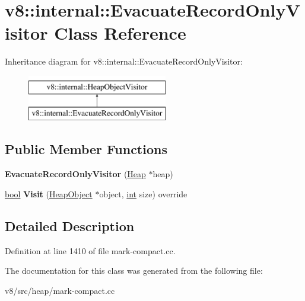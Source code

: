 \hypertarget{classv8_1_1internal_1_1EvacuateRecordOnlyVisitor}{}\section{v8\+:\+:internal\+:\+:Evacuate\+Record\+Only\+Visitor Class Reference}
\label{classv8_1_1internal_1_1EvacuateRecordOnlyVisitor}
Inheritance diagram for v8\+:\+:internal\+:\+:Evacuate\+Record\+Only\+Visitor\+:\begin{figure}[H]
\begin{center}
\leavevmode
\includegraphics[height=2.000000cm]{classv8_1_1internal_1_1EvacuateRecordOnlyVisitor}
\end{center}
\end{figure}
\subsection*{Public Member Functions}
\begin{DoxyCompactItemize}
\item 
\mbox{\label{classv8_1_1internal_1_1EvacuateRecordOnlyVisitor_a8e0748a9199cee3b8007aebb2d228604}} 
{\bfseries Evacuate\+Record\+Only\+Visitor} (\mbox{\hyperlink{classv8_1_1internal_1_1Heap}{Heap}} $\ast$heap)
\item 
\mbox{\label{classv8_1_1internal_1_1EvacuateRecordOnlyVisitor_a99bc644738bc5df2756dc541344aed43}} 
\mbox{\hyperlink{classbool}{bool}} {\bfseries Visit} (\mbox{\hyperlink{classv8_1_1internal_1_1HeapObject}{Heap\+Object}} $\ast$object, \mbox{\hyperlink{classint}{int}} size) override
\end{DoxyCompactItemize}


\subsection{Detailed Description}


Definition at line 1410 of file mark-\/compact.\+cc.



The documentation for this class was generated from the following file\+:\begin{DoxyCompactItemize}
\item 
v8/src/heap/mark-\/compact.\+cc\end{DoxyCompactItemize}
